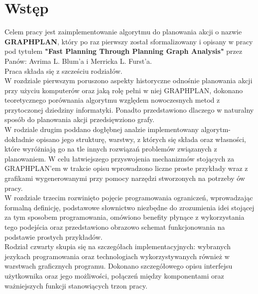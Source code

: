 \chapter*{Wstęp}

\thispagestyle{chapterBeginStyle}

Celem pracy jest zaimplementowanie algorytmu do planowania akcji o nazwie \textbf{GRAPHPLAN}, który po raz pierwszy został sformalizowany i opisany w pracy pod tytułem
\textbf{"Fast Planning Through Planning Graph Analysis"}\cite{GRAPHPLAN} przez Panów: Avrima L. Blum'a i Merricka L. Furst'a.
\\
Praca składa się z szcześciu rodziałów.
\\

	W rozdziale pierwszym poruszono aspekty historyczne odnośnie planowania akcji przy użyciu komputerów oraz jaką rolę pełni w niej GRAPHPLAN,
dokonano teoretycznego porównania algorytmu względem nowoczesnych metod z przytoczonej dziedziny informatyki. Ponadto przedstawiono dlaczego
w naturalny sposób do planowania akcji przedsięwziono grafy.
\\

	W rodziale drugim poddano dogłębnej analzie implementowany algorytm- dokładnie opisano jego strukturę, warstwy, z których się składa oraz własności,
które wyróżniają go na tle innych rozwiązań problemów związanych z planowaniem. W celu łatwiejszego przyswojenia mechanizmów stojących
za GRAPHPLAN'em w trakcie opisu wprowadzono liczne proste przykłady wraz z grafikami wygenerowanymi przy pomocy narzędzi stworzonych
na potrzeby ów pracy.
\\

	W rozdziale trzecim rozwinięto pojęcie programowania ograniczeń, wprowadzając formalną definicję, podstawowe słownictwo niezbędne do 
	zrozumienia idei stojącej za tym sposobem programowania, omówiono benefity płynące z wykorzystania tego podejścia oraz przedstawiono
	obrazowo schemat funkcjonowania na podstawie prostych przykładów.
\\

	Rodział czwarty skupia się na szczegółach implementacyjnych: wybranych jezykach programowania oraz technologiach wykorzystywanych również
w warstwach graficznych programu. Dokonano szczegółowego opisu interfejsu użytkownika oraz jego możliwości, połączeń między komponentami oraz 
ważniejszych funkcji stanowiących trzon pracy.
\\

